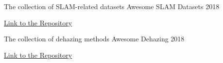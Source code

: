 

\begin{cventries}

  \cventry
    {The collection of SLAM-related datasets} %
    {Awesome SLAM Datasets} %
    { } %
    {2018} %
    {
      \begin{cvitems} %
        \item {\href{https://github.com/youngguncho/awesome-slam-datasets}{Link to the Repository}}
      \end{cvitems}
    }

  \cventry
    {The collection of dehazing methods} %
    {Awesome Dehazing} %
    { } %
    {2018} %
    {
      \begin{cvitems} %
        \item {\href{https://github.com/youngguncho/awesome-dehazing}{Link to the Repository}}
      \end{cvitems}
    }

\end{cventries}

